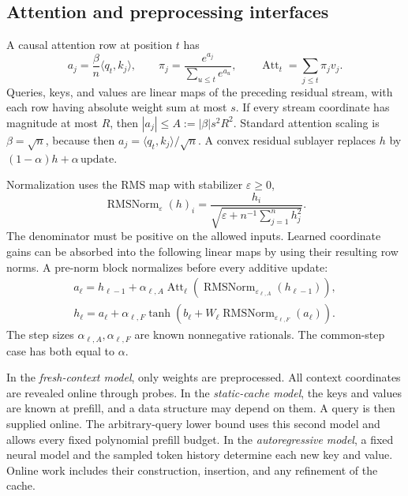 \documentclass[11pt]{article}
\theoremstyle{definition}
\theoremstyle{remark}
\DeclareMathOperator{\RMS}{RMSNorm}
\numberwithin{equation}{section}
\begin{document}
\subsection{Attention and preprocessing interfaces}

A causal attention row at position $t$ has
\begin{equation}
 a_j=\frac{\beta}{n}\langle q_t,k_j\rangle,\qquad
 \pi_j=\frac{e^{a_j}}{\sum_{u\le t}e^{a_u}},\qquad
 \operatorname{Att}_t=\sum_{j\le t}\pi_j v_j .
 \label{eq:main-attention}
\end{equation}
Queries, keys, and values are linear maps of the preceding residual
stream, with each row having absolute weight sum at most $s$.
If every stream coordinate has magnitude at most $R$, then
$|a_j|\le A:=|\beta|s^2R^2$. Standard attention scaling is
$\beta=\sqrt n$, because then $a_j=\langle q_t,k_j\rangle/\sqrt n$.
A convex residual sublayer replaces $h$ by
$(1-\alpha)h+\alpha\,\mathrm{update}$.

Normalization uses the RMS map with stabilizer $\varepsilon\ge0$,
\begin{equation}
 \RMS_\varepsilon(h)_i
   =\frac{h_i}{\sqrt{\varepsilon+n^{-1}\sum_{j=1}^n h_j^2}}.
 \label{eq:main-rms}
\end{equation}
The denominator must be positive on the allowed inputs.
Learned coordinate gains can be absorbed into the following
linear maps by using their resulting row norms.
A pre-norm block normalizes before every additive update:
\begin{equation}
\begin{gathered}
 a_\ell=h_{\ell-1}
      +\alpha_{\ell,A}\operatorname{Att}_{\ell}
          (\RMS_{\varepsilon_{\ell,A}}(h_{\ell-1})),\\
 h_\ell=a_\ell
      +\alpha_{\ell,F}\tanh(b_\ell+W_\ell
          \RMS_{\varepsilon_{\ell,F}}(a_\ell)).
\end{gathered}
 \label{eq:main-prenorm}
\end{equation}
The step sizes $\alpha_{\ell,A},\alpha_{\ell,F}$ are known nonnegative
rationals. The common-step case has both equal to $\alpha$.

In the \emph{fresh-context model}, only weights are preprocessed.
All context coordinates are revealed online through probes. In the
\emph{static-cache model}, the keys and values are known at prefill,
and a data structure may depend on them. A query is then supplied
online. The arbitrary-query lower bound uses this second model and
allows every fixed polynomial prefill budget. In the
\emph{autoregressive model}, a fixed neural model and the sampled
token history determine each new key and value. Online work includes
their construction, insertion, and any refinement of the cache.
\end{document}
